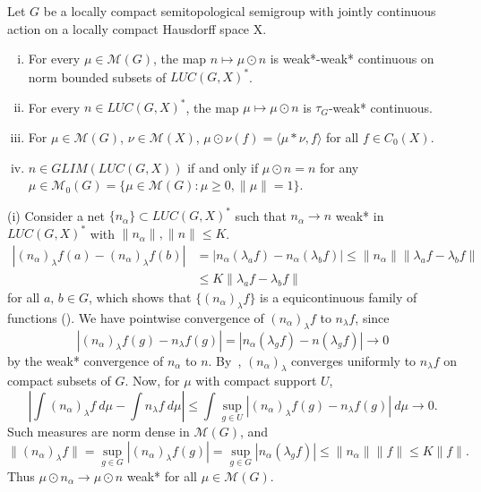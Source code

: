 \begin{lemma}\label{wong}
Let $G$ be a locally compact semitopological semigroup with jointly continuous action
on a locally compact Hausdorff space X.
\begin{enumerate}[(i)]
\item For every $\mu\in \mathcal{M}(G)$, the map $n \mapsto {\mu}\odot n$ is weak*-weak* continuous on norm bounded subsets of $LUC(G,X)^*$.
\item For every $n\in LUC(G,X)^*$, the map $\mu\mapsto {\mu}\odot n$ is $\tau_G$-weak* continuous.
\item For $\mu\in \mathcal{M}(G)$, $\nu\in \mathcal{M}(X)$, ${\mu}\odot{\nu}(f) = \langle\mu * \nu, f\rangle$ for all $f\in C_0(X)$.
\item $n\in GLIM(LUC(G,X))$ if and only if ${\mu}\odot n = n$ for any $\mu\in \mathcal{M}_0 (G) = \{\mu\in \mathcal{M}(G) : \mu \geq 0, \|\mu\| = 1\}$.
\end{enumerate}
\end{lemma}

\proof
(i) Consider a net $\{n_\alpha \} \subset LUC(G,X)^*$ such that $n_\alpha \rightarrow n$ weak* in $LUC(G,X)^*$
with $\|n_\alpha \|, \|n\| \leq K$.
\begin{align*}
|(n_\alpha)_\lambda f(a) - (n_\alpha)_\lambda f(b)| &= |n_\alpha (\lambda_a f) - n_\alpha (\lambda_b f)| \leq \|n_\alpha \| \|\lambda_a f - \lambda_b f\| \\
&\leq K \|\lambda_a f - \lambda_b f\|
\end{align*}
for all $a,\,b\in G$, which shows that $\{(n_\alpha)_\lambda f\}$ is a equicontinuous family of functions
(\cite[p. 232]{kelley:top}).
We have pointwise convergence of $(n_\alpha)_\lambda f$ to $n_\lambda f$, since
\[
|(n_\alpha)_\lambda f(g) - n_\lambda f(g)| = |n_\alpha (\lambda_g f) - n(\lambda_g f)| \rightarrow 0
\]
by the weak* convergence of $n_\alpha$ to $n$.  By~\cite[Theorem 7.15]{kelley:top}, $(n_\alpha)_\lambda$ converges uniformly
to $n_\lambda f$ on compact subsets of $G$.
Now, for $\mu$ with compact support $U$,
\[
\left|\int(n_\alpha)_\lambda f\:d\mu - \int n_\lambda f\:d\mu \right| \leq
\int \sup_{g\in U}|(n_\alpha)_\lambda f(g) - n_\lambda f(g)|\:d\mu \rightarrow 0.
\]
Such measures are norm dense in $\mathcal{M}(G)$, and
\[
\|(n_\alpha)_\lambda f\| = \sup_{g\in G}|(n_\alpha)_\lambda f(g)| = \sup_{g\in G} |n_\alpha (\lambda_g f)| \leq \|n_\alpha \| \|f\| \leq K\|f\|.
\]
Thus ${\mu} \odot n_\alpha \rightarrow {\mu} \odot n$ weak* for all $\mu\in \mathcal{M}(G)$.

